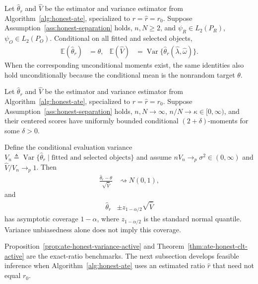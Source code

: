 \begin{proposition}
\label{prop:ate-honest-variance-active}
	Let $\widehat\theta_r$ and $\widehat V$ be the estimator and variance estimator from Algorithm~\ref{alg:honest-ate}, specialized to $r=\widehat r=r_0$. Suppose Assumption~\ref{ass:honest-separation} holds, $n,N\geq2$, and $\psi_R\in L_2(P_R)$, $\psi_O\in L_2(P_O)$. Conditional on all fitted and selected objects,
	\begin{align*}
		\mathbb E(\widehat\theta_r)&=\theta,
		&
		\mathbb E(\widehat V)
		&=
		\operatorname{Var}\{\widehat\theta_r(\widehat\lambda,\widehat\omega)\}.
	\end{align*}
	When the corresponding unconditional moments exist, the same identities also hold unconditionally because the conditional mean is the nonrandom target $\theta$.
\end{proposition}


\begin{theorem}
\label{thm:ate-honest-clt-active}

Let $\widehat\theta_r$ and $\widehat V$ be the estimator and variance
estimator from Algorithm~\ref{alg:honest-ate}, specialized to
$r=\widehat r=r_0$. Suppose Assumption~\ref{ass:honest-separation} holds, $n,N\to\infty$, $n/N\to\kappa\in[0,\infty)$, and their centered scores
have uniformly bounded conditional $(2+\delta)$-moments for some $\delta>0$.

Define the conditional evaluation variance
$V_n\triangleq\operatorname{Var}\{\widehat\theta_r\mid\text{fitted and selected objects}\}$ and assume
$nV_n\to_p\sigma^2\in(0,\infty)$ and
$\widehat V/V_n\to_p 1$. Then
\begin{align*}
\frac{\widehat\theta_r-\theta}{\sqrt{\widehat V}}
&\rightsquigarrow N(0,1),
\end{align*}
and
\begin{align*}
\widehat\theta_r
&\mathbin{\pm}z_{1-\alpha/2}\sqrt{\widehat V}
\end{align*}
has asymptotic coverage $1-\alpha$, where $z_{1-\alpha/2}$ is the standard
normal quantile. Variance unbiasedness alone does not imply this coverage.
\end{theorem}

Proposition~\ref{prop:ate-honest-variance-active} and
Theorem~\ref{thm:ate-honest-clt-active} are the exact-ratio benchmarks. The next
subsection develops feasible inference when Algorithm~\ref{alg:honest-ate} uses
an estimated ratio $\widehat r$ that need not equal $r_0$.

